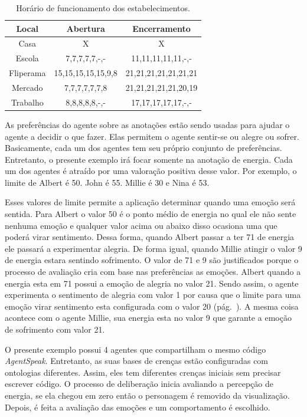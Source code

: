 \begin{table}[h]
	\caption{Horário de funcionamento dos estabelecimentos.}
	\label{tab:estaloca}
	\begin{center}
	\begin{tabular}{|c|c|c|}
		\hline
		Local & Abertura & Encerramento \\ \hline
		Casa & X & X \\ \hline
		Escola & 7,7,7,7,7,-,- & 11,11,11,11,11,-,- \\ \hline
		Fliperama & 15,15,15,15,15,9,8 & 21,21,21,21,21,21,21 \\ \hline
		Mercado & 7,7,7,7,7,7,8 & 21,21,21,21,21,20,19 \\ \hline
		Trabalho & 8,8,8,8,8,-,- & 17,17,17,17,17,-,- \\ \hline
	\end{tabular}
	\end{center}
\end{table}

As preferências do agente sobre as anotações estão sendo usadas para ajudar o
agente a decidir o que fazer. Elas permitem o agente sentir-se ou alegre ou
sofrer. Basicamente, cada um dos agentes tem seu próprio conjunto de
preferências. Entretanto, o presente exemplo irá focar somente na anotação de
energia. Cada um dos agentes é atraído por uma valoração positiva desse valor.
Por exemplo, o limite de Albert é 50. John é 55. Millie é 30 e Nina é 53.

Esses valores de limite permite a aplicação determinar quando uma emoção será
sentida. Para Albert o valor 50 é o ponto médio de energia no qual ele não
sente nenhuma emoção e qualquer valor acima ou abaixo disso ocasiona uma que
poderá virar sentimento. Dessa forma, quando Albert passar a ter 71 de energia
ele passará a experimentar alegria. De forma igual, quando Millie atingir o
valor 9 de energia estara sentindo sofrimento. O valor de 71 e 9 são
justificados porque o processo de avaliação cria com base nas preferências as
emoções. Albert quando a energia esta em 71 possui a emoção de alegria no
valor 21. Sendo assim, o agente experimenta o sentimento de alegria com valor
1 por causa que o limite para uma emoção virar sentimento esta configurada com o
valor 20 (pág.~\pageref{mark:emo}). A mesma coisa acontece com o agente Millie,
sua energia esta no valor 9 que garante a emoção de sofrimento com valor 21.

O presente exemplo possui 4 agentes que compartilham o mesmo código
\emph{AgentSpeak}. Entretanto, as suas bases de crenças estão configuradas com
ontologias diferentes. Assim, eles tem diferentes crenças iniciais sem
precisar escrever código. O processo de deliberação inicia avaliando a
percepção de energia, se ela chegou em zero então o personagem é removido da
visualização. Depois, é feita a avaliação das emoções e um comportamento é
escolhido.

